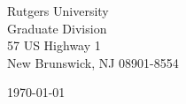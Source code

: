 \begin{minipage}{0.49\textwidth}
\begin{flushleft}
\noindent
Rutgers University\\
Graduate Division\\
57 US Highway 1\\
New Brunswick, NJ 08901-8554\\

\end{flushleft}
\end{minipage}
\begin{minipage}{0.47\textwidth}
\begin{flushright}
\today
\end{flushright}
\end{minipage} \\

\newcommand{\univ}{Rutgers University}
\newcommand{\univshort}{Rutgers}
\newcommand{\degree}{M.Sc.}
\newcommand{\dept}{Computer Science}



